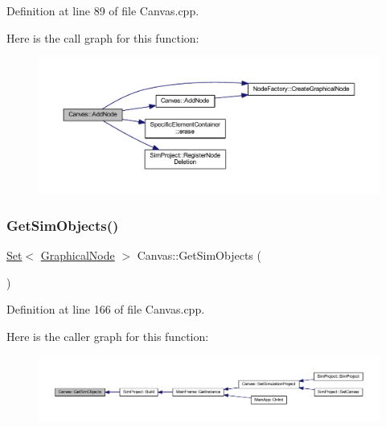 Definition at line 89 of file Canvas.\+cpp.

Here is the call graph for this function\+:
\nopagebreak
\begin{figure}[H]
\begin{center}
\leavevmode
\includegraphics[width=350pt]{class_canvas_aaec53b68c7b24704e399b565731ed545_cgraph}
\end{center}
\end{figure}
\mbox{\label{class_canvas_a21d8ffb18a14cb10af590d3d66efe956}} 
\subsubsection{\texorpdfstring{Get\+Sim\+Objects()}{GetSimObjects()}}
{\footnotesize\ttfamily \hyperlink{class_set}{Set}$<$ \hyperlink{class_graphical_node}{Graphical\+Node} $>$ Canvas\+::\+Get\+Sim\+Objects (\begin{DoxyParamCaption}{ }\end{DoxyParamCaption})}



Definition at line 166 of file Canvas.\+cpp.

Here is the caller graph for this function\+:
\nopagebreak
\begin{figure}[H]
\begin{center}
\leavevmode
\includegraphics[width=350pt]{class_canvas_a21d8ffb18a14cb10af590d3d66efe956_icgraph}
\end{center}
\end{figure}
\mbox{\label{class_canvas_ae7b17a82b7376ee4105b8f36179ab90e}} 
